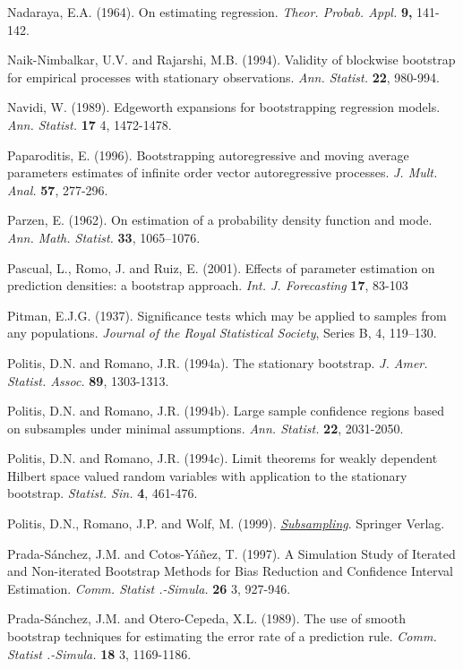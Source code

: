 \documentclass[
]{book}
\theoremstyle{break}
\theoremstyle{nonumberplain}
\begin{document}
Nadaraya, E.A. (1964). On estimating regression. \emph{Theor. Probab. Appl.}
\textbf{9,} 141-142.

Naik-Nimbalkar, U.V. and Rajarshi, M.B. (1994). Validity of blockwise
bootstrap for empirical processes with stationary observations.
\emph{Ann. Statist.} \textbf{22}, 980-994.

Navidi, W. (1989). Edgeworth expansions for bootstrapping regression
models. \emph{Ann. Statist.} \textbf{17} 4, 1472-1478.

Paparoditis, E. (1996). Bootstrapping autoregressive and moving average
parameters estimates of infinite order vector autoregressive processes.
\emph{J. Mult. Anal.} \textbf{57}, 277-296.

Parzen, E. (1962). On estimation of a probability density function and
mode. \emph{Ann. Math. Statist.} \textbf{33}, 1065--1076.

Pascual, L., Romo, J. and Ruiz, E. (2001). Effects of parameter
estimation on prediction densities: a bootstrap approach.
\emph{Int. J. Forecasting} \textbf{17}, 83-103

Pitman, E.J.G. (1937). Significance tests which may be applied to samples from any populations. \emph{Journal of the Royal Statistical Society}, Series B, 4, 119--130.

Politis, D.N. and Romano, J.R. (1994a). The stationary bootstrap.
\emph{J. Amer. Statist. Assoc.} \textbf{89}, 1303-1313.

Politis, D.N. and Romano, J.R. (1994b). Large sample confidence regions
based on subsamples under minimal assumptions. \emph{Ann. Statist.} \textbf{22},
2031-2050.

Politis, D.N. and Romano, J.R. (1994c). Limit theorems for weakly
dependent Hilbert space valued random variables with application to the
stationary bootstrap. \emph{Statist. Sin.} \textbf{4}, 461-476.

Politis, D.N., Romano, J.P. and Wolf, M. (1999). \href{https://books.google.es/books?hl=es&lr=&id=nGu6rqjE6JoC&oi=fnd&pg=PR7&dq=Subsampling}{\emph{Subsampling}}.
Springer Verlag.

Prada-Sánchez, J.M. and Cotos-Yáñez, T. (1997). A Simulation Study of
Iterated and Non-iterated Bootstrap Methods for Bias Reduction and
Confidence Interval Estimation. \emph{Comm. Statist .-Simula.} \textbf{26} 3, 927-946.

Prada-Sánchez, J.M. and Otero-Cepeda, X.L. (1989). The use of smooth
bootstrap techniques for estimating the error rate of a prediction rule.
\emph{Comm. Statist .-Simula.} \textbf{18} 3, 1169-1186.
\end{document}
